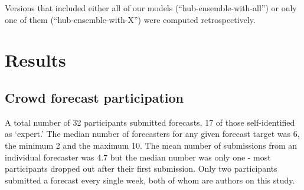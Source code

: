 \documentclass[
]{article}
\begin{document}
Versions that included either all of our models (``hub-ensemble-with-all'') or only one of them (``hub-ensemble-with-X'') were computed retrospectively.

\hypertarget{results}{%
\section{Results}\label{results}}

\hypertarget{crowd-forecast-participation}{%
\subsection{Crowd forecast participation}\label{crowd-forecast-participation}}

A total number of 32 participants submitted forecasts, 17 of those self-identified as `expert.' The median number of forecasters for any given forecast target was 6, the minimum 2 and the maximum 10. The mean number of submissions from an individual forecaster was 4.7 but the median number was only one - most participants dropped out after their first submission. Only two participants submitted a forecast every single week, both of whom are authors on this study.
\end{document}
